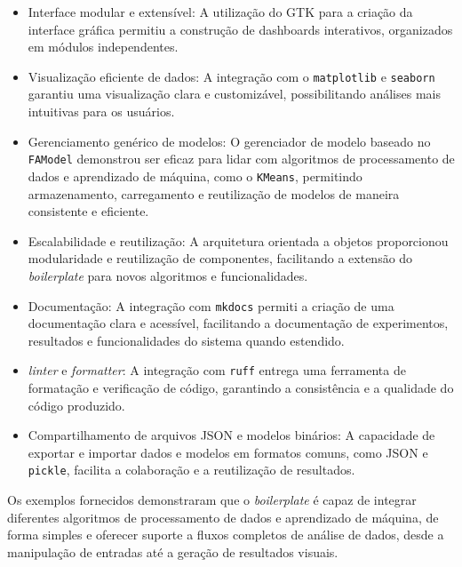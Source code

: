 \begin{itemize}
    \item Interface modular e extensível: A utilização do GTK para a criação da interface gráfica permitiu a construção de dashboards interativos, organizados em módulos independentes.
    
    \item Visualização eficiente de dados: A integração com o \texttt{matplotlib} e \texttt{seaborn} garantiu uma visualização clara e customizável, possibilitando análises mais intuitivas para os usuários.
    
    \item Gerenciamento genérico de modelos: O gerenciador de modelo baseado no \texttt{FAModel} demonstrou ser eficaz para lidar com algoritmos de processamento de dados e aprendizado de máquina, como o \texttt{KMeans}, permitindo armazenamento, carregamento e reutilização de modelos de maneira consistente e eficiente.
    
    \item Escalabilidade e reutilização: A arquitetura orientada a objetos proporcionou modularidade e reutilização de componentes, facilitando a extensão do \textit{boilerplate} para novos algoritmos e funcionalidades.

    \item Documentação: A integração com \texttt{mkdocs} permiti a criação de uma documentação clara e acessível, facilitando a documentação de experimentos, resultados e funcionalidades do sistema quando estendido.

    \item \textit{linter} e \textit{formatter}: A integração com \texttt{ruff} entrega uma ferramenta de formatação e verificação de código, garantindo a consistência e a qualidade do código produzido.

    \item Compartilhamento de arquivos JSON e modelos binários: A capacidade de exportar e importar dados e modelos em formatos comuns, como JSON e \texttt{pickle}, facilita a colaboração e a reutilização de resultados.
\end{itemize}

Os exemplos fornecidos demonstraram que o \textit{boilerplate} é capaz de integrar diferentes algoritmos de processamento de dados e aprendizado de máquina, de forma simples e oferecer suporte a fluxos completos de análise de dados, desde a manipulação de entradas até a geração de resultados visuais.

